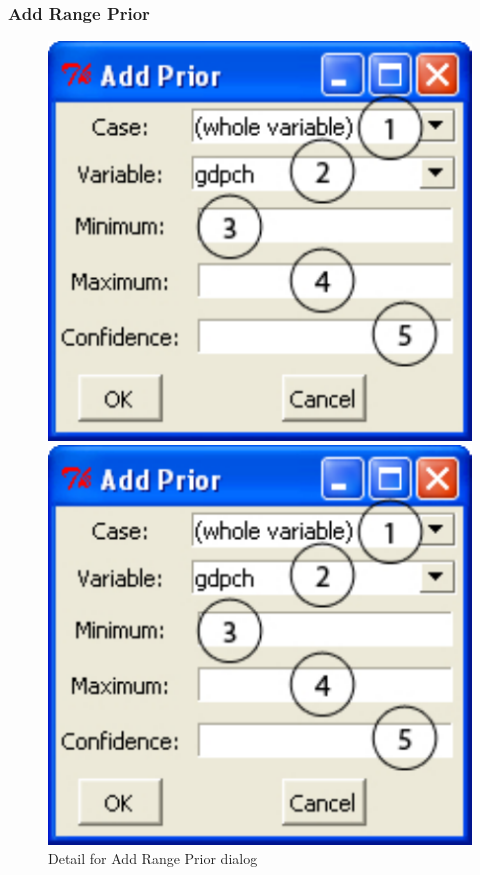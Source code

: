\documentclass[12pt,titlepage]{article}
\begin{document}
\subsubsection{Add Range Prior}\label{sec:refrangepri}
\begin{figure}[h]
  \centering 
  \begin{htmlonly} 
    \includegraphics[scale=1]{rangepri} 
  \end{htmlonly}
  \begin{latexonly}
    \includegraphics[scale=.75]{rangepri}
  \end{latexonly}
  \caption{Detail for Add Range Prior dialog}
\end{figure}
\end{document}
